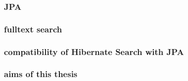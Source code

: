 \subsubsection{JPA}

\subsubsection{fulltext search}

\subsubsection{compatibility of Hibernate Search with JPA}

\subsubsection{aims of this thesis}
